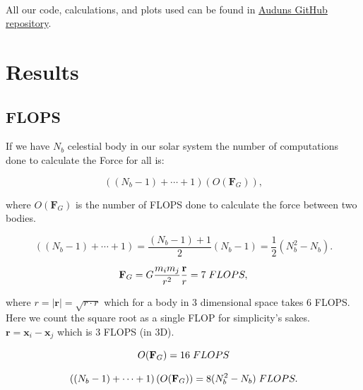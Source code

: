 \documentclass[a4paper, fontsize=11pt]{article}
\begin{document}
\paragraph{}
All our code, calculations, and plots used can be found in \href{https://github.com/auduntre/FYS4150/tree/master/Project%203}{Auduns GitHub repository}.

\section{Results}

\subsection{FLOPS}

If we have $N_b$ celestial body in our solar system the number of computations done to calculate the Force for all is:

\begin{equation}
\left((N_b  - 1) + \cdots + 1\right)(O(\textbf{F}_{G})),
\end{equation}

where $O(\textbf{F}_{G})$ is the number of FLOPS done to calculate the force between two bodies.

\begin{equation}
\left((N_b  - 1) + \cdots + 1\right) = \frac{(N_b  - 1) + 1}{2}(N_b - 1) = \frac{1}{2}(N_b^2 - N_b).
\end{equation}

\begin{equation}
\textbf{F}_{G} = G\frac{m_i m_j}{r^2} \frac{\textbf{r}}{r} = 7 \hspace{1mm} FLOPS,
\end{equation}

where $r = |\textbf{r}| = \sqrt{r \cdot r}$ which for a body in 3 dimensional space takes 6 FLOPS. Here we count the square root as a single FLOP for simplicity's sakes.  $\textbf{r} = \textbf{x}_i - \textbf{x}_j$ which is 3 FLOPS (in 3D). 

\begin{equation}
O(\textbf{F}_{G}) = 16 \hspace{1mm} FLOPS
\end{equation}

\begin{equation}
\left((N_b  - 1) + \cdots + 1\right)(O(\textbf{F}_{G})) = 8(N_b^2 - N_b) \hspace{1mm} FLOPS.
\end{equation}
\end{document}
